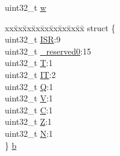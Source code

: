 \begin{DoxyCompactItemize}
\begin{tabbing}
\end{tabbing}\item 
uint32\-\_\-t \hyperlink{unionx_p_s_r___type_ad0fb62e7a08e70fc5e0a76b67809f84b}{w}
\item 
\begin{tabbing}
xx\=xx\=xx\=xx\=xx\=xx\=xx\=xx\=xx\=\kill
struct \{\\
\>uint32\_t \hyperlink{unionx_p_s_r___type_ad502ba7dbb2aab5f87c782b28f02622d}{ISR}:9\\
\>uint32\_t \hyperlink{unionx_p_s_r___type_ac8a6a13838a897c8d0b8bc991bbaf7c1}{\_reserved0}:15\\
\>uint32\_t \hyperlink{unionx_p_s_r___type_a6e1cf12e53a20224f6f62c001d9be972}{T}:1\\
\>uint32\_t \hyperlink{unionx_p_s_r___type_a76485660fe8ad98cdc71ddd7cb0ed777}{IT}:2\\
\>uint32\_t \hyperlink{unionx_p_s_r___type_a65f27ddc4f7e09c14ce7c5211b2e000a}{Q}:1\\
\>uint32\_t \hyperlink{unionx_p_s_r___type_acd4a2b64faee91e4a9eef300667fa222}{V}:1\\
\>uint32\_t \hyperlink{unionx_p_s_r___type_a7a1caf92f32fe9ebd8d1fe89b06c7776}{C}:1\\
\>uint32\_t \hyperlink{unionx_p_s_r___type_a5ae954cbd9986cd64625d7fa00943c8e}{Z}:1\\
\>uint32\_t \hyperlink{unionx_p_s_r___type_abae0610bc2a97bbf7f689e953e0b451f}{N}:1\\
\} \hyperlink{unionx_p_s_r___type_a5fe7b3d4251f5516a5cc744f416a600a}{b}\\


\end{tabbing}
\end{DoxyCompactItemize}
